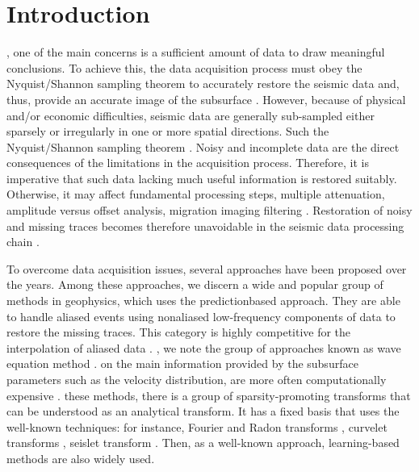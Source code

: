 \section{Introduction}

   , one of the main concerns is  a sufficient amount of data to draw meaningful conclusions. To achieve this, the data acquisition process must obey the Nyquist/Shannon sampling theorem to accurately restore the seismic data and, thus, provide an accurate image of the subsurface \citep{cao2011review,wang2013data}. However, because of physical and/or economic difficulties, seismic data are generally sub-sampled either sparsely or irregularly in one or more spatial directions. Such  the Nyquist/Shannon sampling theorem \citep{chiu2014multidimensional}. Noisy and incomplete data are the direct consequences of the limitations in the acquisition process. Therefore, it is imperative that such data lacking much useful information is restored suitably. Otherwise, it may  affect fundamental processing steps,  multiple attenuation, amplitude versus offset analysis, migration imaging filtering \citep{adamo20143d,lopez2015closed}. Restoration of noisy and missing traces becomes therefore unavoidable in the seismic data processing chain \citep{shuwei2016cs,yangkang2019nc}. 

To overcome data acquisition issues, several approaches have been proposed over the years. Among these approaches, we discern a wide and popular group of methods in geophysics, which uses the prediction\wen{-}based approach. They are able to handle aliased events using nonaliased low-frequency components of data to restore the missing traces. This category is highly competitive for the interpolation of aliased data \citep{spitz1991seismic,crawley1999interpolation,porsani1999seismic}.
, we note the group of approaches known as wave equation method \citep{ronen1987wave}.  on the main information provided by the subsurface parameters such as the velocity distribution, are more often computationally expensive \citep{canning1998reducing,fomel2003seismic}.  these methods, there is a group of sparsity-promoting transforms that can be understood as an analytical transform. It has a fixed basis that uses the well-known techniques: for instance, Fourier and Radon transforms \citep{kabir1995restoration,abma20063d}, curvelet transforms \citep{candes20061},  seislet transform \citep{fomel2010seislet}. Then, as a well-known approach, learning-based \citep{cai2014data,amir2017geo} methods are also widely used. 

